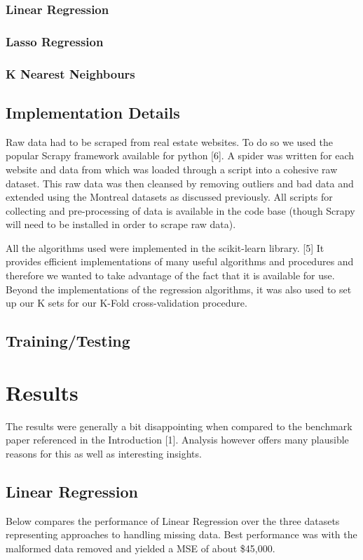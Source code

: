 \documentclass{acm_proc_article-sp}
\begin{document}
\subsubsection{Linear Regression}
\subsubsection{Lasso Regression}
\subsubsection{K Nearest Neighbours}

\subsection{Implementation Details}
	Raw data had to be scraped from real estate websites. To do so we used the popular Scrapy framework available for python [6]. A spider was written for each website and data from which was loaded through a script into a cohesive raw dataset. This raw data was then cleansed by removing outliers and bad data and extended using the Montreal datasets as discussed previously. All scripts for collecting and pre-processing of data is available in the code base (though Scrapy will need to be installed in order to scrape raw data).
	
	All the algorithms used were implemented in the scikit-learn library. [5] It provides efficient implementations of many useful algorithms and procedures and therefore we wanted to take advantage of the fact that it is available for use. Beyond the implementations of the regression algorithms, it was also used to set up our K sets for our K-Fold cross-validation procedure. 

\subsection{Training/Testing}


\section{Results}
	 The results were generally a bit disappointing when compared to the benchmark paper referenced in the Introduction [1]. Analysis however offers many plausible reasons for this as well as interesting insights. 
	 
\subsection{Linear Regression}
	Below compares the performance of Linear Regression over the three datasets representing approaches to handling missing data. Best performance was with the malformed data removed and yielded a MSE of about \$45,000.
	 
\end{document}
